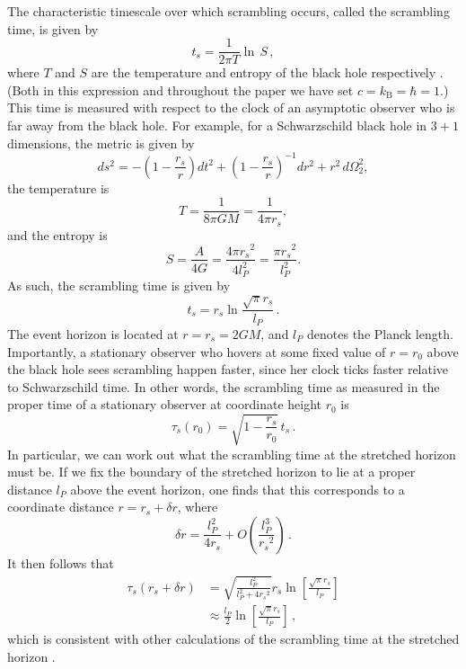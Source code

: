\documentclass[a4paper,11pt]{article}
\theoremstyle{definition}
\begin{document}
The characteristic timescale over which scrambling occurs, called the scrambling time, is given by
\begin{equation}
t_s = \frac{1}{2\pi T} \ln \, S \, ,
\end{equation}
where $T$ and $S$ are the temperature and entropy of the black hole respectively \cite{Hayden:2007cs, Sekino:2008he, Shenker:2013pqa, Shenker:2014cwa, Maldacena:2015waa}.
(Both in this expression and throughout the paper we have set $c=k_\mathrm{B}=\hbar=1$.)
This time is measured with respect to the clock of an asymptotic observer who is far away from the black hole.
For example, for a Schwarzschild black hole in $3+1$ dimensions, the metric is given by
\begin{equation}
ds^2 = -\left(1-\frac{r_s}{r}\right) dt^2 + \left(1-\frac{r_s}{r}\right)^{-1} dr^2 + r^2 \, d\Omega_2^2,
\end{equation} the temperature is 
\begin{equation}
T=\frac{1}{8 \pi G M}=\frac{1}{4 \pi r_s},
\end{equation} and the entropy is
\begin{equation}
S=\frac{A}{4G}=\frac{4 \pi {r_s}^2}{4 l_P^2}=\frac{\pi {r_s}^2}{l_P^2}.
\end{equation} 
As such, the scrambling time is given by
\begin{equation} \label{eq:asympts}
t_s = {r_s} \ln \frac{\sqrt{\pi}{r_s}}{l_P} \, .
\end{equation}
The event horizon is located at $r={r_s}=2 G M$, and $l_P$ denotes the Planck length.
Importantly, a stationary observer who hovers at some fixed value of $r=r_0$ above the black hole sees scrambling happen faster, since her clock ticks faster relative to Schwarzschild time.
In other words, the scrambling time as measured in the proper time of a stationary observer at coordinate height $r_0$ is
\begin{equation}
\tau_s(r_0) = \sqrt{1-\frac{{r_s}}{r_0}} \, t_s \, .
\end{equation}
In particular, we can work out what the scrambling time at the stretched horizon must be.
If we fix the boundary of the stretched horizon to lie at a proper distance $l_P$ above the event horizon, one finds that this corresponds to a coordinate distance $r = {r_s} + \delta r$, where
\begin{equation} \label{eq:shorcoord}
\delta r = \frac{l_P^2}{4{r_s}} + O\left(\frac{l_P^3}{{r_s}^2}\right) \, .
\end{equation}
It then follows that
\begin{align}
\nonumber \tau_s({r_s}+\delta r) &= \sqrt{\frac{l_P^2}{l_P^2 + 4 {r_s}^2}} {r_s} \ln\left[\frac{\sqrt{\pi}{r_s}}{l_P}\right] \\[2mm]
&\approx \frac{l_P}{2}  \ln\left[\frac{\sqrt{\pi}{r_s}}{l_P}\right] \, , \label{eq:horizonts}
\end{align}
which is consistent with other calculations of the scrambling time at the stretched horizon \cite{Hayden:2007cs, Sekino:2008he}.
\end{document}
